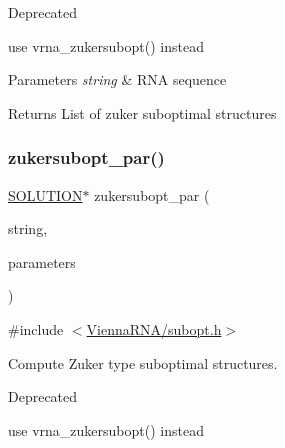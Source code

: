 \begin{DoxyRefDesc}{Deprecated}
\item[\mbox{\hyperlink{deprecated__deprecated000153}{Deprecated}}]use vrna\+\_\+zukersubopt() instead\end{DoxyRefDesc}



\begin{DoxyParams}{Parameters}
{\em string} & R\+NA sequence \\
\hline
\end{DoxyParams}
\begin{DoxyReturn}{Returns}
List of zuker suboptimal structures 
\end{DoxyReturn}
\mbox{\label{group__subopt__zuker_gab6d0ea8cc1d02f6dd831ca81043c9eb8}} 
\subsubsection{\texorpdfstring{zukersubopt\+\_\+par()}{zukersubopt\_par()}}
{\footnotesize\ttfamily \mbox{\hyperlink{subopt_8h_aa0f46ff02e1017469cf902d02ecd7f9a}{S\+O\+L\+U\+T\+I\+ON}}$\ast$ zukersubopt\+\_\+par (\begin{DoxyParamCaption}\item[{const char $\ast$}]{string,  }\item[{\mbox{\hyperlink{group__energy__parameters_ga8a69ca7d787e4fd6079914f5343a1f35}{vrna\+\_\+param\+\_\+t}} $\ast$}]{parameters }\end{DoxyParamCaption})}



{\ttfamily \#include $<$\mbox{\hyperlink{subopt_8h}{Vienna\+R\+N\+A/subopt.\+h}}$>$}



Compute Zuker type suboptimal structures. 

\begin{DoxyRefDesc}{Deprecated}
\item[\mbox{\hyperlink{deprecated__deprecated000154}{Deprecated}}]use vrna\+\_\+zukersubopt() instead\end{DoxyRefDesc}
